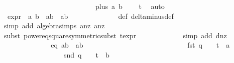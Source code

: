 \begin{isabellebody}
\ \ \ \ \ \ \ \ \ \ \ \ \ \ \ \ \ \ \ \ \ \ \ \ \ \ {\isachardoublequoteopen}{\isasymdelta}{\isacharunderscore}plus\ a{}\ b{}\ {\isacharequal}\ {}{\isachardoublequoteclose}\ \isamarkupfalse%
\ t{}\ \isamarkupfalse%
\ auto\isanewline
\ \ \ \ \ \ \ \ \ \ \isamarkupfalse%
\ {\isasymdelta}{\isacharprime}{\isacharunderscore}expr{\isacharcolon}\ {\isachardoublequoteopen}{\isasymdelta}{\isacharprime}\ a{}\ b{}\ {\isacharequal}\ a{}{\isacharasterisk}b{}\ {\isacharminus}\ a{}{\isacharasterisk}b{}{\isachardoublequoteclose}\isanewline
\ \ \ \ \ \ \ \ \ \ \ \ \isamarkupfalse%
\ {\isasymdelta}{\isacharprime}{\isacharunderscore}def\ delta{\isacharunderscore}minus{\isacharunderscore}def\ \isanewline
\ \ \ \ \ \ \ \ \ \ \ \ \isamarkupfalse%
{\isacharparenleft}simp\ add{\isacharcolon}\ algebra{\isacharunderscore}simps\ a{}{\isacharunderscore}nz\ a{}{\isacharunderscore}nz{\isacharparenright}\isanewline
\ \ \ \ \ \ \ \ \ \ \ \ \isamarkupfalse%
{\isacharparenleft}subst\ power{}{\isacharunderscore}eq{\isacharunderscore}square{\isacharbrackleft}symmetric{\isacharbrackright}{\isacharcomma}subst\ t{\isacharunderscore}expr{\isacharparenleft}{}{\isacharparenright}{\isacharparenright}\isanewline
\ \ \ \ \ \ \ \ \ \ \ \ \isamarkupfalse%
{\isacharparenleft}simp\ add{\isacharcolon}\ d{\isacharunderscore}nz{\isacharparenright}\isanewline
\ \ \ \ \ \ \ \ \ \ \isamarkupfalse%
\ \isamarkupfalse%
\ eq{}{\isacharprime}{\isacharcolon}\ {\isachardoublequoteopen}a{}{\isacharasterisk}b{}\ {\isacharminus}\ a{}{\isacharasterisk}b{}\ {\isacharequal}\ {}{\isachardoublequoteclose}\ \isanewline
\ \ \ \ \ \ \ \ \ \ \isamarkupfalse%
\ {\isacharminus}\isanewline
\ \ \ \ \ \ \ \ \ \ \ \ \isamarkupfalse%
\ {\isachardoublequoteopen}{\isacharparenleft}fst\ q{\isacharparenright}\ {\isacharequal}\ {\isacharparenleft}{}\ {\isacharslash}\ {\isacharparenleft}t\ {\isacharasterisk}\ a{}{\isacharparenright}{\isacharparenright}{\isachardoublequoteclose}\ \isanewline
\ \ \ \ \ \ \ \ \ \ \ \ \ \ \ \ \ {\isachardoublequoteopen}{\isacharparenleft}snd\ q{\isacharparenright}\ {\isacharequal}\ {\isacharparenleft}{}\ {\isacharslash}\ {\isacharparenleft}t\ {\isacharasterisk}\ b{}{\isacharparenright}{\isacharparenright}{\isachardoublequoteclose}\isanewline

\end{isabellebody}
